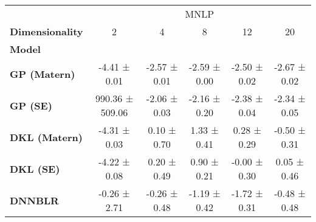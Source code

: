 \begin{tabular}{lccccc}
\toprule
{} & \multicolumn{5}{c}{MNLP} \\
\textbf{Dimensionality} &               2  &            4  &            8  &            12 &            20 \\
\textbf{Model       } &                  &               &               &               &               \\
\midrule
\textbf{GP (Matern) } &     -4.41 ± 0.01 &  -2.57 ± 0.01 &  -2.59 ± 0.00 &  -2.50 ± 0.02 &  -2.67 ± 0.02 \\
\textbf{GP (SE)     } &  990.36 ± 509.06 &  -2.06 ± 0.03 &  -2.16 ± 0.20 &  -2.38 ± 0.04 &  -2.34 ± 0.05 \\
\textbf{DKL (Matern)} &     -4.31 ± 0.03 &   0.10 ± 0.70 &   1.33 ± 0.41 &   0.28 ± 0.29 &  -0.50 ± 0.31 \\
\textbf{DKL (SE)    } &     -4.22 ± 0.08 &   0.20 ± 0.49 &   0.90 ± 0.21 &  -0.00 ± 0.30 &   0.05 ± 0.46 \\
\textbf{DNNBLR      } &     -0.26 ± 2.71 &  -0.26 ± 0.48 &  -1.19 ± 0.42 &  -1.72 ± 0.31 &  -0.48 ± 0.48 \\
\bottomrule
\end{tabular}
